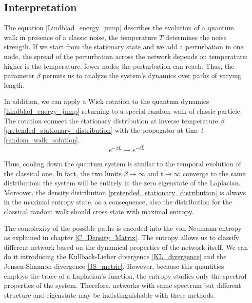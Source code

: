 \subsection{Interpretation}

The equation \eqref{Lindblad_energy_jump} describes the evolution of a quantum walk in presence of a classic noise, the temperature $T$ determines the noise strength.
If we start from the stationary state and we add a perturbation in one node, the spread of the perturbation across the network depends on temperature: higher is the temperature, fewer nodes the perturbation can reach. Thus, the parameter $\beta$ permits us to analyze the system's dynamics over paths of varying length.

In addition, we can apply a Wick rotation to the quantum dynamics \eqref{Lindblad_energy_jump} returning to a special random walk of classic particle. The rotation connect the stationary distribution at inverse temperature $\beta$ \eqref{pretended_stationary_distribution} with the propagator at time $t$ \eqref{random_walk_solution}.
\begin{equation}
e^{-\beta\hat L} \rightarrow e^{-t\hat L}
\end{equation}

Thus, cooling down the quantum system is similar to the temporal evolution of the classical one. In fact, the two limits $\beta \rightarrow \infty$ and $t \rightarrow \infty$ converge to the same distribution: the system will be entirely in the zero eigenstate of the Laplacian.
Moreover, the density distribution \eqref{pretended_stationary_distribution} is always in the maximal entropy state, as a consequence, also the  distribution for the classical random walk should cross state with maximal entropy.

The complexity of the possible paths is encoded into the von Neumann entropy as explained in chapter \ref{C_Density_Matrix}.
The entropy allows us to classify different network based on the dynamical properties of the network itself. 
We can do it introducing the Kullback-Lieber divergence \eqref{KL_divergence} and the Jensen-Shannon divergence \eqref{JS_metric}.
However, because this quantities employs the trace of a Laplacian's function, the entropy studies only the spectral properties of the system. Therefore, networks with same spectrum but different structure and eigenstate may be indistinguishable with these methods.